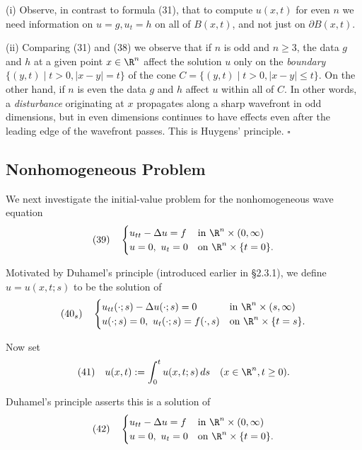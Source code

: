 \begin{remark}
\label{rem:huygens-principle}
(i) Observe, in contrast to formula (31), that to compute $u(x,t)$ for even $n$ we need information on $u = g, u_t = h$ on all of $B(x,t)$, and not just on $\partial B(x,t)$.

(ii) Comparing (31) and (38) we observe that if $n$ is odd and $n \geq 3$, the data $g$ and $h$ at a given point $x \in \R^n$ affect the solution $u$ only on the \textit{boundary} $\{(y,t) \mid t > 0, |x-y| = t\}$ of the cone $C = \{(y,t) \mid t > 0, |x-y| \leq t\}$. On the other hand, if $n$ is even the data $g$ and $h$ affect $u$ within all of $C$. In other words, a \textit{disturbance} originating at $x$ propagates along a sharp wavefront in odd dimensions, but in even dimensions continues to have effects even after the leading edge of the wavefront passes. This is Huygens' principle. $\square$
\end{remark}

\subsection{Nonhomogeneous Problem}
\label{sec:wave-nonhomogeneous-problem}

We next investigate the initial-value problem for the nonhomogeneous wave equation
$$(39) \quad \begin{cases} u_{tt} - \Delta u = f & \text{in } \R^n\times(0,\infty) \\ u=0,\ u_t=0 & \text{on } \R^n\times\{t=0\}. \end{cases}$$

Motivated by Duhamel's principle (introduced earlier in \S2.3.1), we define $u = u(x,t;s)$ to be the solution of
$$(40_s) \quad \begin{cases} u_{tt}(\cdot;s) - \Delta u(\cdot;s) = 0 & \text{in } \R^n\times(s,\infty) \\ u(\cdot;s) = 0,\ u_t(\cdot;s) = f(\cdot,s) & \text{on } \R^n\times\{t=s\}. \end{cases}$$

Now set
$$(41) \quad u(x,t) := \int_0^t u(x,t;s)\,ds \quad (x \in \R^n, t \geq 0).$$

Duhamel's principle asserts this is a solution of
$$(42) \quad \begin{cases} u_{tt} - \Delta u = f & \text{in } \R^n\times(0,\infty) \\ u=0,\ u_t=0 & \text{on } \R^n\times\{t=0\}. \end{cases}$$

